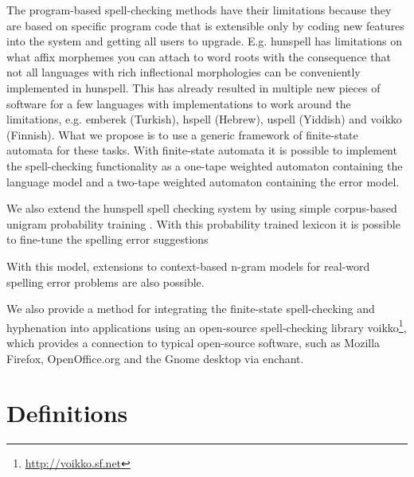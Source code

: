 \documentclass[a4paper,runningheads]{llncs}
\begin{document}
The program-based spell-checking methods have their limitations
because they are based on specific program code that is extensible
only by coding new features into the system and getting all users to
upgrade. E.g. hunspell has limitations on what affix morphemes you can
attach to word roots with the consequence that not all languages with
rich inflectional morphologies can be conveniently implemented in
hunspell. This has already resulted in multiple new pieces of software
for a few languages with implementations to work around the
limitations, e.g.  emberek (Turkish), hspell (Hebrew), uspell
(Yiddish) and voikko (Finnish). What we propose is to use a generic
framework of finite-state automata for these tasks. With finite-state
automata it is possible to implement the spell-checking functionality
as a one-tape weighted automaton containing the language model and a
two-tape weighted automaton containing the error model.

We also extend the hunspell spell checking system by using simple corpus-based
unigram probability training \cite{conf/lrec/Pirinen2010}. With this probability
trained lexicon it is possible to fine-tune the spelling error suggestions 

With this model, extensions to
context-based n-gram models for real-word spelling error problems
\cite{DBLP:conf/cicling/Wilcox-OHearnHB08} are also possible.

We also provide a method for integrating the finite-state spell-checking
and hyphenation into applications using an open-source spell-checking
library voikko\footnote{\url{http://voikko.sf.net}}, which provides a
connection to typical open-source software, such as Mozilla Firefox,
OpenOffice.org and the Gnome desktop via enchant.

\section{Definitions}
\label{sec:definitions}
\end{document}
